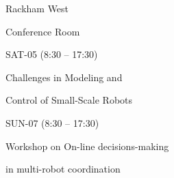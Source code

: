 \documentclass{article}
\begin{document}
\rssheader[2in]

\rssbig
\begin{center}
Rackham West \par \noindent Conference Room
\end{center}

\vfill

\rssmed
\begin{center}
SAT-05 (8:30 -- 17:30)
\end{center}

\rsssm
\begin{center}
Challenges in Modeling and \par \noindent Control of Small-Scale Robots
\end{center}

\vfill

\rssmed
\begin{center}
SUN-07 (8:30 -- 17:30)
\end{center}

\rsssm
\begin{center}
Workshop on On-line decisions-making \par \noindent in multi-robot coordination
\end{center}

\vfill
\end{document}
